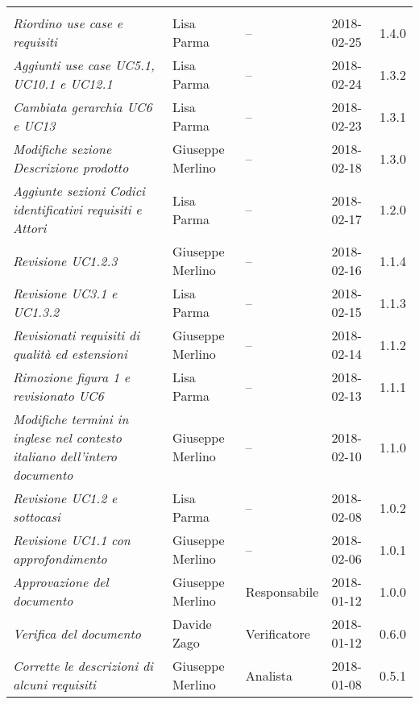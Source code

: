 \newpage 
\section*{}
\begin{longtable}{C{4cm}|C{3cm}|C{3cm}|C{2.5cm}|C{2cm}}
		 & & & & \\
		\emph{Riordino use case e requisiti} & Lisa Parma & -- & 2018-02-25 & 1.4.0 \\
		\hline
		\emph{Aggiunti use case UC5.1, UC10.1 e UC12.1 } & Lisa Parma & -- & 2018-02-24 & 1.3.2 \\
		\hline
		\emph{Cambiata gerarchia UC6 e UC13} & Lisa Parma & -- & 2018-02-23 & 1.3.1 \\
		\hline
		\emph{Modifiche sezione Descrizione prodotto} & Giuseppe Merlino & -- & 2018-02-18 & 1.3.0 \\
		\hline		
		\emph{Aggiunte sezioni Codici identificativi requisiti e Attori} & Lisa Parma & -- & 2018-02-17 & 1.2.0 \\
		\hline
		\emph{Revisione  UC1.2.3 }& Giuseppe Merlino & -- & 2018-02-16 & 1.1.4 \\
		\hline
		\emph{Revisione UC3.1 e UC1.3.2}& Lisa Parma & -- & 2018-02-15 & 1.1.3 \\
		\hline
		\emph{Revisionati requisiti di qualità ed estensioni}&Giuseppe Merlino & -- & 2018-02-14 & 1.1.2 \\
		\hline
		\emph{Rimozione figura 1 e revisionato UC6}& Lisa Parma & -- & 2018-02-13 & 1.1.1 \\
		\hline
		\emph{Modifiche termini in inglese nel contesto italiano dell'intero documento}& Giuseppe Merlino & -- & 2018-02-10 & 1.1.0 \\
		\hline
		\emph{Revisione UC1.2 e sottocasi}& Lisa Parma & -- & 2018-02-08 & 1.0.2 \\
		\hline
		\emph{Revisione UC1.1 con approfondimento}& Giuseppe Merlino & -- & 2018-02-06 & 1.0.1 \\
		\hline
		\emph{Approvazione del documento}& Giuseppe Merlino & Responsabile & 2018-01-12 & 1.0.0 \\
		\hline
		\emph{Verifica del documento}& Davide Zago & Verificatore & 2018-01-12 & 0.6.0 \\
		\hline
		\emph{Corrette le descrizioni di alcuni requisiti}& Giuseppe Merlino & Analista & 2018-01-08 & 0.5.1 \\

\end{longtable}

